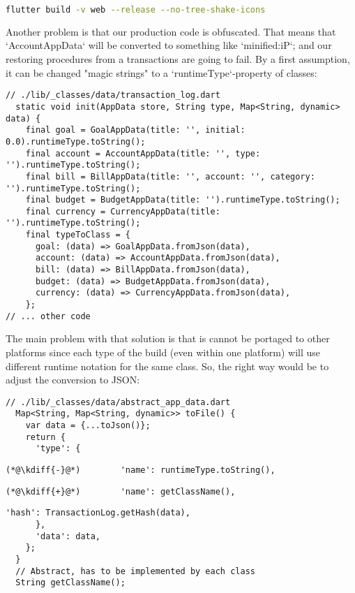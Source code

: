\begin{lstlisting}[language=bash]
flutter build -v web --release --no-tree-shake-icons
\end{lstlisting}

Another problem is that our production code is obfuscated. That means that `AccountAppData` will be converted to 
something like `minified:iP`; and our restoring procedures from a transactions are going to fail. By a first assumption,
it can be changed "magic strings" to a `runtimeType`-property of classes:

\begin{lstlisting}
// ./lib/_classes/data/transaction_log.dart
  static void init(AppData store, String type, Map<String, dynamic> data) {
    final goal = GoalAppData(title: '', initial: 0.0).runtimeType.toString();
    final account = AccountAppData(title: '', type: '').runtimeType.toString();
    final bill = BillAppData(title: '', account: '', category: '').runtimeType.toString();
    final budget = BudgetAppData(title: '').runtimeType.toString();
    final currency = CurrencyAppData(title: '').runtimeType.toString();
    final typeToClass = {
      goal: (data) => GoalAppData.fromJson(data),
      account: (data) => AccountAppData.fromJson(data),
      bill: (data) => BillAppData.fromJson(data),
      budget: (data) => BudgetAppData.fromJson(data),
      currency: (data) => CurrencyAppData.fromJson(data),
    };
// ... other code
\end{lstlisting}

\noindent The main problem with that solution is that is cannot be portaged to other platforms since each type of the 
build (even within one platform) will use different runtime notation for the same class. So, the right way would be 
to adjust the conversion to JSON:

\begin{lstlisting}
// ./lib/_classes/data/abstract_app_data.dart
  Map<String, Map<String, dynamic>> toFile() {
    var data = {...toJson()};
    return {
      'type': {
\end{lstlisting}
{
\xpretocmd{\lstlisting}{\vspace{-12pt}}{}{}
\begin{lstlisting}[firstnumber=6, backgroundcolor=\color{backred}]
(*@\kdiff{-}@*)        'name': runtimeType.toString(),
\end{lstlisting}
\begin{lstlisting}[firstnumber=6, backgroundcolor=\color{backgreen}]
(*@\kdiff{+}@*)        'name': getClassName(),
\end{lstlisting}
\begin{lstlisting}[firstnumber=7]
        'hash': TransactionLog.getHash(data),
      },
      'data': data,
    };
  }
  // Abstract, has to be implemented by each class
  String getClassName();
\end{lstlisting}
}

